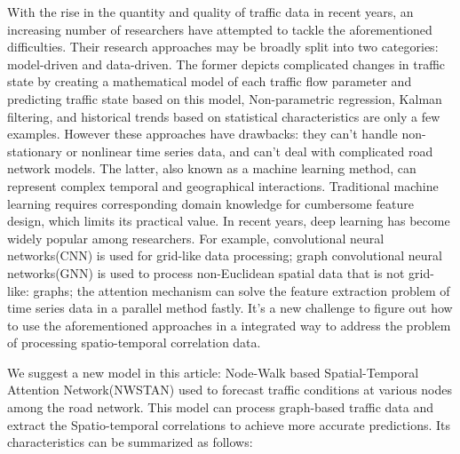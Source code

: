 \documentclass[conference]{IEEEtran}
\begin{document}
\par
With the rise in the quantity and quality of traffic data in recent years, an increasing number of researchers have attempted to tackle the aforementioned difficulties. Their research approaches may be broadly split into two categories: model-driven and data-driven. The former depicts complicated changes in traffic state by creating a mathematical model of each traffic flow parameter and predicting traffic state based on this model, Non-parametric regression, Kalman filtering, and historical trends based on statistical characteristics are only a few examples\cite{b3}. However these approaches have drawbacks: they can't handle non-stationary or nonlinear time series data, and can't deal with complicated road network models. The latter, also known as a machine learning method, can represent complex temporal and geographical interactions. Traditional machine learning requires corresponding domain knowledge for cumbersome feature design, which limits its practical value. In recent years, deep learning has become widely popular among researchers. For example, convolutional neural networks(CNN) is used for grid-like data processing\cite{b4}; 
graph convolutional neural networks(GNN) is used to process non-Euclidean spatial data that is not grid-like: graphs\cite{b5}; the attention mechanism can solve the feature extraction problem of time series data in a parallel method fastly\cite{b6}. It's a new challenge to figure out how to use the aforementioned approaches in a integrated way to address the problem of processing spatio-temporal correlation data.
\par
We suggest a new model in this article: Node-Walk based Spatial-Temporal Attention Network(NWSTAN) used to forecast traffic conditions at various nodes among the road network. This model can process graph-based traffic data and extract the Spatio-temporal correlations to achieve more accurate predictions. Its characteristics can be summarized as follows:
\par
\end{document}
